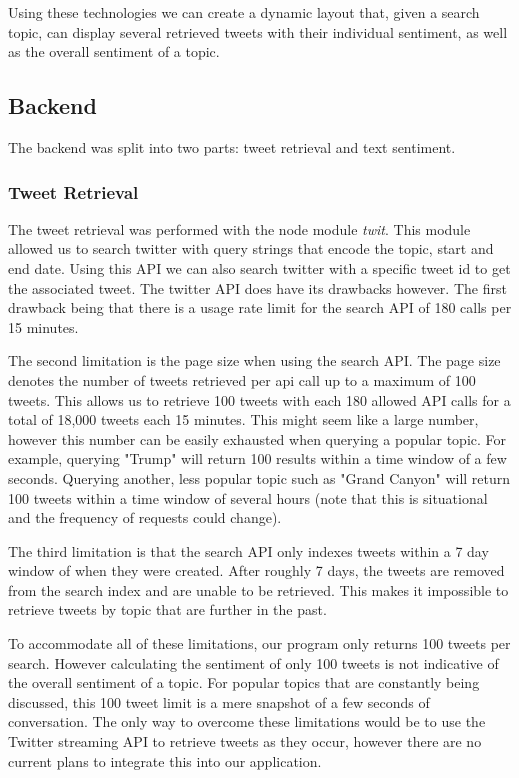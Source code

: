 Using these technologies we can create a dynamic layout that, given a search topic, can display several retrieved tweets with their individual sentiment, as well as the overall sentiment of a topic.

\subsection{Backend}
The backend was split into two parts: tweet retrieval and text sentiment. 

\subsubsection{Tweet Retrieval}
The tweet retrieval was performed with the node module {\em twit}. This module allowed us to search twitter with query strings that encode the topic, start and end date. Using this API we can also search twitter with a specific tweet id to get the associated tweet. The twitter API does have its drawbacks however. The first drawback being that there is a usage rate limit for the search API of 180 calls per 15 minutes. 

The second limitation is the page size when using the search API. The page size denotes the number of tweets retrieved per api call up to a maximum of 100 tweets. This allows us to retrieve 100 tweets with each 180 allowed API calls for a total of 18,000 tweets each 15 minutes. This might seem like a large number, however this number can be easily exhausted when querying a popular topic. For example, querying "Trump" will return 100 results within a time window of a few seconds. Querying another, less popular topic such as "Grand Canyon" will return 100 tweets within a time window of several hours (note that this is situational and the frequency of requests could change).

The third limitation is that the search API only indexes tweets within a 7 day window of when they were created. After roughly 7 days, the tweets are removed from the search index and are unable to be retrieved. This makes it impossible to retrieve tweets by topic that are further in the past.

To accommodate all of these limitations, our program only returns 100 tweets per search. However calculating the sentiment of only 100 tweets is not indicative of the overall sentiment of a topic. For popular topics that are constantly being discussed, this 100 tweet limit is a mere snapshot of a few seconds of conversation. The only way to overcome these limitations would be to use the Twitter streaming API to retrieve tweets as they occur, however there are no current plans to integrate this into our application.

